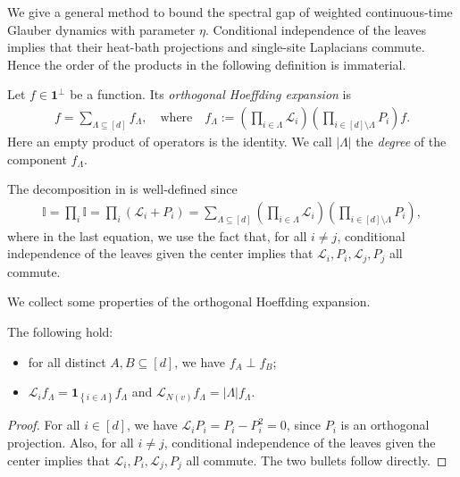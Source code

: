 \documentclass[a4paper,12pt]{article}
\theoremstyle{plain}
\theoremstyle{definition}
\def\*#1{\mathbf{#1}} %
\def\+#1{\mathcal{#1}} %
\def\*#1{\boldsymbol{#1}} %
\def\+#1{\mathcal{#1}} %
\newcommand{\set}[1]{\left\{#1\right\}}
\newcommand{\tuple}[1]{\left(#1\right)}
\newcommand{\tp}{\tuple}
\newcommand{\abs}[1]{\left\vert#1\right\vert}
\begin{document}
We give a general method to bound the spectral gap of
weighted continuous-time Glauber dynamics with parameter $\eta$.
Conditional independence of the leaves implies that their heat-bath
projections and single-site Laplacians commute.  Hence the order of the
products in the following definition is immaterial.

\begin{definition} \label{def:Hoeffding-expand}
Let $f \in \*1^\perp$ be a function.
Its \emph{orthogonal Hoeffding expansion} is
\begin{align*}
  f = \sum_{\Lambda \subseteq [d]} f_\Lambda, \quad \text{where} \quad f_\Lambda := \tp{\prod_{i\in\Lambda}\+L_i}\tp{\prod_{i\in[d]\setminus\Lambda}P_i}f.
\end{align*}
Here an empty product of operators is the identity.
We call $|\Lambda|$ the \emph{degree} of the component $f_\Lambda$.
\end{definition}

\begin{remark}
    The decomposition in  is well-defined since
    \begin{align*}
        \mathbb{I} = \prod_i \mathbb{I} = \prod_i\tp{\+L_i + P_i} = \sum_{\Lambda \subseteq [d]} \tp{\prod_{i\in\Lambda}\+L_i}\tp{\prod_{i\in[d]\setminus\Lambda}P_i},
    \end{align*}
    where in the last equation, we use the fact that, for all $i\neq j$, conditional independence of the leaves given the center implies that
  $\+L_i,P_i,\+L_j,P_j$ all commute.
\end{remark}

We collect some properties of the orthogonal Hoeffding expansion.
\begin{proposition} \label{prop:Hoeffding-expand}
  The following hold:
  \begin{itemize}
  \item for all distinct $A,B\subseteq[d]$, we have $f_A\perp f_B$;
  \item $\+L_i f_\Lambda = \*1_{\set{i\in\Lambda}}f_\Lambda$ and
    $\+L_{N(v)} f_\Lambda = \abs{\Lambda} f_\Lambda$.
  \end{itemize}
\end{proposition}
\begin{proof}
  For all $i\in[d]$, we have $\+L_iP_i=P_i-P_i^2=0$, since $P_i$ is
  an orthogonal projection.  Also, for all $i\neq j$, conditional
  independence of the leaves given the center implies that
  $\+L_i,P_i,\+L_j,P_j$ all commute.
  The two bullets follow directly.
\end{proof}
\end{document}
